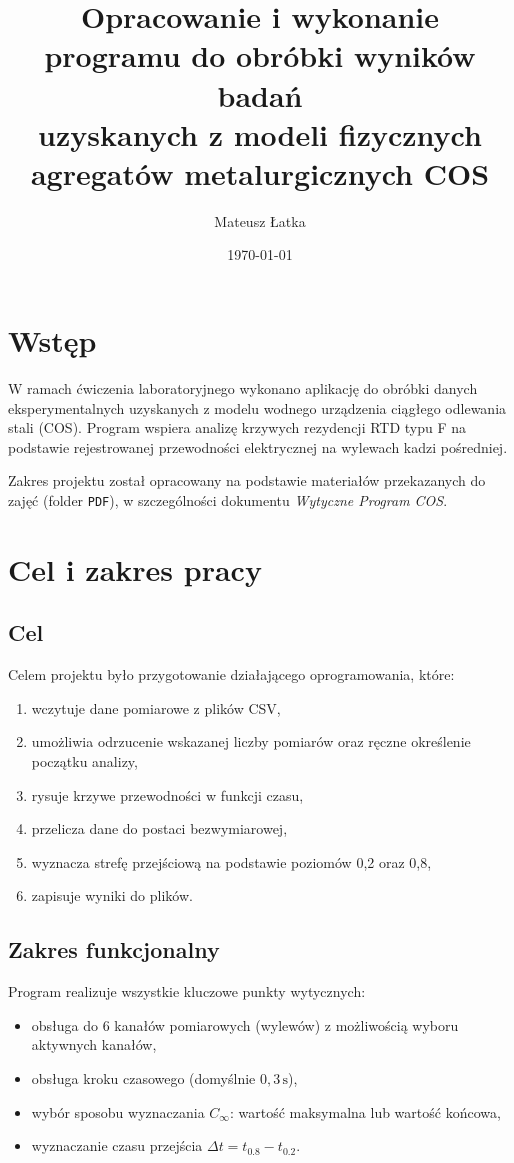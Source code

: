 \documentclass[12pt,a4paper]{article}
\title{%
Opracowanie i wykonanie programu do obróbki wyników badań\\
uzyskanych z modeli fizycznych agregatów metalurgicznych COS}
\author{Mateusz Łatka}
\date{\today}
\begin{document}
\maketitle
\thispagestyle{fancy}
\newpage

\tableofcontents
\newpage

\section{Wstęp}
W ramach ćwiczenia laboratoryjnego wykonano aplikację do obróbki danych eksperymentalnych uzyskanych z modelu wodnego urządzenia ciągłego odlewania stali (COS). Program wspiera analizę krzywych rezydencji RTD typu F na podstawie rejestrowanej przewodności elektrycznej na wylewach kadzi pośredniej.

Zakres projektu został opracowany na podstawie materiałów przekazanych do zajęć (folder \texttt{PDF}), w szczególności dokumentu \textit{Wytyczne Program COS}.

\section{Cel i zakres pracy}
\subsection{Cel}
Celem projektu było przygotowanie działającego oprogramowania, które:
\begin{enumerate}
    \item wczytuje dane pomiarowe z plików CSV,
    \item umożliwia odrzucenie wskazanej liczby pomiarów oraz ręczne określenie początku analizy,
    \item rysuje krzywe przewodności w funkcji czasu,
    \item przelicza dane do postaci bezwymiarowej,
    \item wyznacza strefę przejściową na podstawie poziomów 0{,}2 oraz 0{,}8,
    \item zapisuje wyniki do plików.
\end{enumerate}

\subsection{Zakres funkcjonalny}
Program realizuje wszystkie kluczowe punkty wytycznych:
\begin{itemize}
    \item obsługa do 6 kanałów pomiarowych (wylewów) z możliwością wyboru aktywnych kanałów,
    \item obsługa kroku czasowego (domyślnie \(0{,}3\,\mathrm{s}\)),
    \item wybór sposobu wyznaczania \(C_\infty\): wartość maksymalna lub wartość końcowa,
    \item wyznaczanie czasu przejścia \(\Delta t = t_{0.8} - t_{0.2}\).
\end{itemize}
\end{document}
